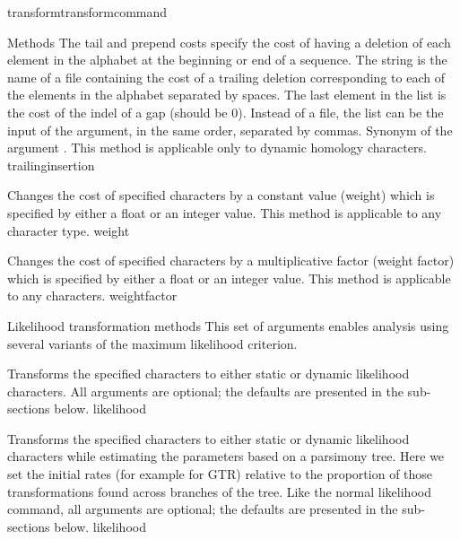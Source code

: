 \begin{command}{transform}{transformcommand}
\begin{arguments}
\begin{argumentgroup}{Methods}
            {The tail and prepend costs specify the cost of having a deletion
            of each element in the alphabet at the beginning or end
            of a sequence. The string is the name of a file containing the cost of
            a trailing deletion corresponding to each of the elements
            in the alphabet separated by spaces. The last element in the list is the
            cost of the indel of a gap (should be 0). Instead of a file, the list can
            be the input of the argument, in the same order, separated by commas.
            Synonym of the argument . This method is applicable 
            only to dynamic homology characters.} 
            {trailinginsertion}
            
            {Changes the cost of specified characters by a
            constant value (weight) which is specified by either a
            float or an integer value. This method is applicable to any character type.} 
            {weight}

            {Changes the cost of specified characters by a
            multiplicative factor (weight factor) which is specified by either a
            float or an integer value. This method is applicable to any characters.} 
            {weightfactor}

             \end{argumentgroup}
         

        \begin{argumentgroup}{Likelihood transformation methods}
            This set of arguments enables analysis using several variants of the
            maximum likelihood criterion. 

                {Transforms the specified characters to either static or dynamic
                likelihood characters. All arguments are optional; the defaults
                are presented in the sub-sections below.}
                {likelihood}

                {Transforms the specified characters to either static or dynamic
                likelihood characters while estimating the parameters based on a
                parsimony tree. Here we set the initial rates (for example for
                GTR) relative to the proportion of those transformations found
                across branches of the tree. Like the normal likelihood command,
                all arguments are optional; the defaults are presented in the
                sub-sections below.}
                {likelihood}


\end{argumentgroup}
\end{arguments}
\end{command}
